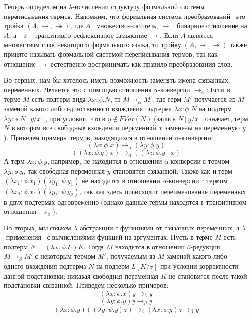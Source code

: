 \documentclass{article}[12pt]
\newcommand{\dash}{\textemdash\ }
\begin{document}
Теперь определим на $\lambda$-исчислении структуру формальной системы переписывания термов.
Напомним, что формальная система преобразований \dash это тройка $(A, \rightarrow, \twoheadrightarrow)$,
где $A$ \dash множество-носитель, $\rightarrow$ \dash бинарное отношение на $A$, а
$\twoheadrightarrow$ \dash транзитивно-рефлексивное замыкание $\rightarrow$. Если $A$ является
множеством слов некоторого формального языка, то тройку $(A, \rightarrow, \twoheadrightarrow)$ также
принято называть формальной системой переписывания термов, так как отношение $\rightarrow$
естественно воспринимать как правило преобразования слов.

Во-первых, нам бы хотелось иметь возможность заменять имена связанных переменных. Делается
это с помощью отношения $\alpha$-конверсии $\rightarrow_\alpha$: Если в терме $M$ есть подтерм вида
$\lambda x : \phi . N$, то $M \rightarrow_\alpha M'$, где терм $M'$ получается из $M$ заменой
какого либо единственного вхождения подтерма $\lambda x : \phi . N$ на подтерм $\lambda y : \phi . N[y/x]$, при условии, что
в $y \not \in FVar(N)$ (запись $N[y/x]$ означает, терм $N$ в котором все свободные вхождении переменной
$x$ заменены на переменную $y$). Приведем примеры термов, находящихся в отношении $\alpha$-конверсии:
$$(\lambda x : \phi . x) \rightarrow_\alpha (\lambda y : \phi . y)$$
$$((\lambda x : \phi . y) x) \rightarrow_\alpha ((\lambda z : \phi . y) x)$$
А терм $\lambda x : \phi . y$, например, не находится в отношении $\alpha$-конверсии с термом
$\lambda y : \phi . y$, так свободная переменная $y$ становится связанной. Также как и
терм $(\lambda x_1 : \phi . x_1)(\lambda y_1 : \psi . y_1)$ не находится в отношении $\alpha$-конверсии
с термом $(\lambda x_2 : \phi . x_2)(\lambda y_2 : \psi . y_2)$, так как
здесь происходит переименование переменных в двух подтермах одновременно (однако данные термы
находятся в транзитивном отношении $\twoheadrightarrow_\alpha$).

Во-вторых, мы свяжем $\lambda$-абстракции с функциями от связанных переменных,
а $\lambda$-применения \dash с вычислениями функций на аргументах.
Пусть в терме $M$ есть подтерм $N = (\lambda x : \phi . L)K$. Тогда $M$ 
находится в отношении  $\beta$-редукции $M \rightarrow_\beta M'$ с некоторым термом $M'$, 
получаемым из $M$ заменой какого-либо одного вхождения подтерма $N$ на подтерм
$L[K/x]$ при условии корректности данной подстановки: никакая свободная переменная $K$ не
становится после такой подстановки связанной. Приведем несколько примеров:
$$(\lambda x : \phi . x) y \rightarrow_\beta y$$
$$(\lambda y : \phi . y) y \rightarrow_\beta y$$
$$(\lambda x : \phi . y)((\lambda y : \psi . y) z) \rightarrow_\beta (\lambda x : \phi . y) z \rightarrow_\beta y$$
\end{document}
